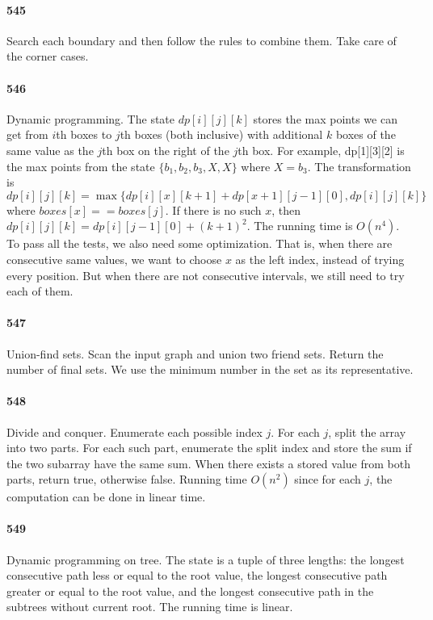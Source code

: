 \documentclass[11pt]{article}
\begin{document}
\begin{itemize}
\paragraph{545}
Search each boundary and then follow the rules to combine them. Take care of the corner cases.

\paragraph{546}
Dynamic programming. The state $dp[i][j][k]$ stores the max points we can get from $i$th boxes to $j$th boxes (both inclusive) 
with additional $k$ boxes of the same value as the $j$th box on the right of the $j$th box. For example, dp[1][3][2] 
is the max points from the state $\{b_1, b_2, b_3, X, X \}$ where $X = b_3$. 
The transformation is $dp[i][j][k] = \max \{dp[i][x][k+1] + dp[x+1][j-1][0], dp[i][j][k] \}$ where $boxes[x] == boxes[j]$.
If there is no such $x$, then $dp[i][j][k] = dp[i][j-1][0] + (k+1)^2$.
The running time is $O(n^4)$. 
To pass all the tests, we also need some optimization. That is, when there are consecutive same values, we want to choose $x$
as the left index, instead of trying every position. But when there are not consecutive intervals, we still need to try each 
of them.

\paragraph{547}
Union-find sets. Scan the input graph and union two friend sets. Return the number of final sets. We use the minimum number
in the set as its representative. 


\paragraph{548}
Divide and conquer. Enumerate each possible index $j$. For each $j$, split the array into two parts. For each such part, 
enumerate the split index and store the sum if the two subarray have the same sum. When there exists a stored value 
from both parts, return true, otherwise false.
Running time $O(n^2)$ since for each $j$, the computation can be done in linear time.


\paragraph{549}
Dynamic programming on tree. The state is a tuple of three lengths: the longest consecutive path less or equal to the root 
value, the longest consecutive path greater or equal to the root value, and the longest consecutive path in the subtrees 
without current root. The running time is linear.


\end{itemize}
\end{document}
